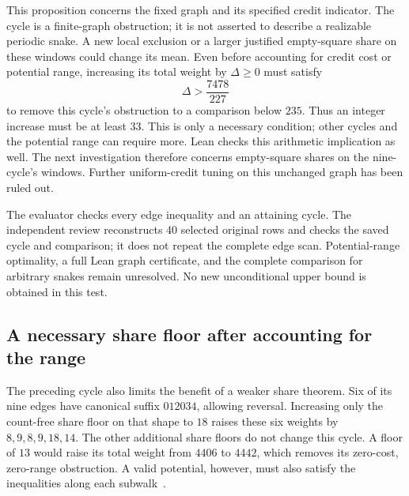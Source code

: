 \documentclass[11pt,a4paper]{article}
\theoremstyle{definition}
\theoremstyle{remark}
\begin{document}
This proposition concerns the fixed graph and its specified credit indicator.
The cycle is a finite-graph obstruction; it is not asserted to describe a
realizable periodic snake. A new local exclusion or a larger justified
empty-square share on these windows could change its mean. Even before
accounting for credit cost or potential range, increasing its total weight
by $\Delta\ge0$ must satisfy
\[
\Delta>\frac{7478}{227}
\]
to remove this cycle's obstruction to a comparison below $235$. Thus an
integer increase must be at least $33$. This is only a necessary condition;
other cycles and the potential range can require more. Lean checks this
arithmetic implication as well. The next investigation therefore concerns
empty-square shares on the nine-cycle's windows. Further uniform-credit
tuning on this unchanged graph has been ruled out.

The evaluator checks every edge inequality and an attaining cycle. The
independent review reconstructs 40 selected original rows and checks the
saved cycle and comparison; it does not repeat the complete edge scan.
Potential-range optimality, a full Lean graph certificate, and the complete
comparison for arbitrary snakes remain unresolved. No new unconditional
upper bound is obtained in this test.

\subsection{A necessary share floor after accounting for the range}\label{sec:share-floor-range}
The preceding cycle also limits the benefit of a weaker share theorem.
Six of its nine edges have canonical suffix $012034$, allowing reversal.
Increasing only the count-free share floor on that shape to $18$ raises
these six weights by $8,9,8,9,18,14$. The other additional share floors do
not change this cycle. A floor of $13$ would raise its total weight from
$4406$ to $4442$, which removes its zero-cost, zero-range obstruction.
A valid potential, however, must also satisfy the inequalities along each
subwalk~\cite{range143archive}.
\end{document}
